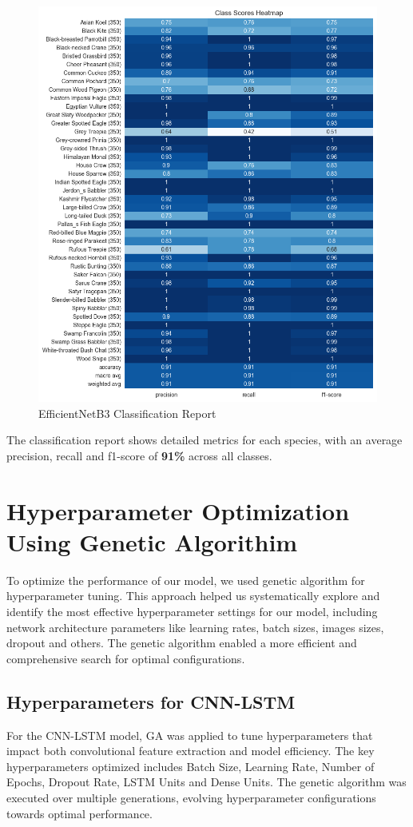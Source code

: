 \begin{figure}[h!]
            \centering
            \includegraphics[scale=0.6]{images/efficientNet_classification_report.png}
            \caption{EfficientNetB3 Classification Report}
      \end{figure}
The classification report shows detailed metrics for each species, with an average precision, recall and f1-score of \textbf{91\%} across all classes.

\newpage
\section{Hyperparameter Optimization Using Genetic Algorithim}
To optimize the performance of our model, we used genetic algorithm for
hyperparameter tuning. This approach helped us systematically explore and
identify the most effective hyperparameter settings for our model, including network architecture parameters like
learning rates, batch sizes, images sizes, dropout and others. The genetic
algorithm enabled a more efficient and comprehensive search for optimal
configurations.
\subsection{Hyperparameters for CNN-LSTM}
For the CNN-LSTM model, GA was applied to tune  hyperparameters that impact both convolutional feature extraction and model efficiency. The key hyperparameters optimized includes Batch Size, Learning Rate, Number of Epochs, Dropout Rate, LSTM Units and Dense Units.
The genetic algorithm was executed over multiple generations, evolving hyperparameter configurations towards optimal performance.


